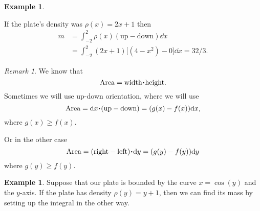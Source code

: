 \documentclass[12pt]{article}
\theoremstyle{plain}
\theoremstyle{definition}
\newtheorem{Ex}[Th]{Example}           %
\theoremstyle{remark}
\newtheorem*{Rmk}{Remark}      %
\renewcommand{\geq}{\geqslant}      %
\renewcommand{\:}{\colon}           %
\renewcommand{\.}{\Cdot}                %
\begin{document}
\begin{multicols}{2}
\begin{Ex}
\begin{center}
  
  \end{center}
  If the plate's density was $\rho(x)=2x+1$ then 
  \begin{align*}
    m&=\int_{-2}^2\rho(x)(\text{up}-\text{down})\dd x\\
    &=\int_{-2}^2(2x+1)\lbrack(4-x^2)-0\rbrack \dd x=32/3.
  \end{align*}
\end{Ex}

\begin{Rmk}
  We know that 
  $$\text{Area}=\text{width}\.\text{height}.$$
  Sometimes we will use up-down orientation, where we will use 
  $$\text{Area}=\dd x\.(\text{up}-\text{down})=(g(x)-f(x))\dd x,$$
  where $g(x)\geq f(x)$.\par 
  Or in the other case
  $$\text{Area}=(\text{right}-\text{left})\.\dd y=(g(y)-f(y))\dd y$$
  where $g(y)\geq f(y)$.
\end{Rmk}

\begin{Ex}
  Suppose that our plate is bounded by the curve $x=\cos(y)$ and the $y$-axis. If the plate has density $\rho(y)=y+1$, then we can find its mass by setting up the integral in the other way.
  \begin{center}
    

 
\tikzset{
  pattern size/.store in=\mcSize, 
  pattern size = 5pt,
  pattern thickness/.store in=\mcThickness, 
  pattern thickness = 0.3pt,
  pattern radius/.store in=\mcRadius, 
  pattern radius = 1pt}
  \makeatletter
  \makeatother
  

\end{center}
\end{Ex}
\end{multicols}
\end{document}

